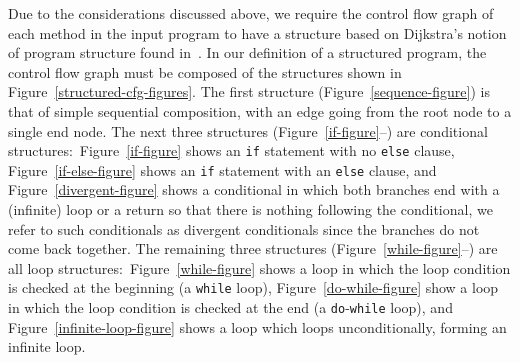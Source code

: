 Due to the considerations discussed above, we require the control flow
graph of each method in the input program to have a structure based on
Dijkstra's notion of program structure found in~\cite{dijkstra1972}.
In our definition of a structured program, the control flow graph must
be composed of the structures shown in
Figure~\ref{structured-cfg-figures}. 
The first structure (Figure~\ref{sequence-figure}) is that of simple
sequential composition, with an edge going from the root node to a
single end node.
The next three structures
(Figure~\ref{if-figure}--) are conditional
structures:~Figure~\ref{if-figure} shows an \texttt{if} statement with
no \texttt{else} clause, Figure~\ref{if-else-figure} shows an
\texttt{if} statement with an \texttt{else} clause, and
Figure~\ref{divergent-figure} shows a conditional in which both
branches end with a (infinite) loop or a return so that there is
nothing following the conditional, we refer to such conditionals as
divergent conditionals since the branches do not come back together.
The remaining three structures
(Figure~\ref{while-figure}--) are all
loop structures:~Figure~\ref{while-figure} shows a loop in which the
loop condition is checked at the beginning (a \texttt{while} loop),
Figure~\ref{do-while-figure} show a loop in which the loop condition
is checked at the end (a \texttt{do}-\texttt{while} loop), and
Figure~\ref{infinite-loop-figure} shows a loop which loops
unconditionally, forming an infinite loop.

